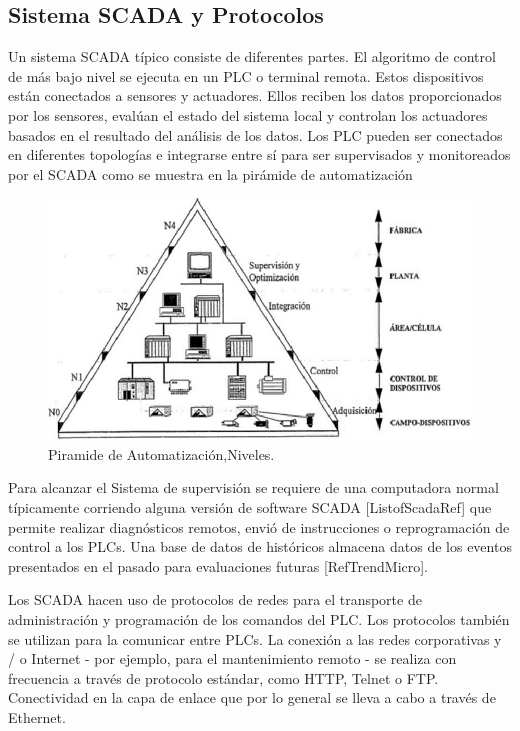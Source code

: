 \documentclass[jou,apacite]{apa6}   %
\begin{document}
\subsection{Sistema SCADA y Protocolos }
Un sistema SCADA típico consiste de diferentes partes. El algoritmo de control de más bajo nivel se ejecuta en un PLC o terminal remota. Estos dispositivos están conectados a sensores y actuadores. Ellos reciben los datos proporcionados por los sensores, evalúan el estado del sistema local  y controlan los actuadores basados en el resultado del análisis de los datos. Los PLC pueden ser conectados en diferentes topologías e integrarse entre sí para ser supervisados y monitoreados por el SCADA como se muestra en la pirámide de automatización 
\begin{figure}[htb]
\centering
\includegraphics[scale=0.4]{images/piramide.png}
\caption{Piramide de Automatización,Niveles.} \label{fig:piramide}
\end{figure}
Para alcanzar el Sistema de supervisión se requiere de una computadora normal típicamente corriendo alguna versión de software SCADA  [ListofScadaRef] que permite realizar diagnósticos remotos, envió de instrucciones o reprogramación de control a los PLCs. Una base de datos de históricos almacena datos de los eventos presentados  en el pasado para evaluaciones futuras [RefTrendMicro]. 

Los SCADA hacen uso de protocolos de redes para el transporte de administración y  programación de los comandos del PLC. Los protocolos también se utilizan para la comunicar  entre PLCs. La conexión a las redes corporativas y / o Internet - por ejemplo, para el mantenimiento remoto - se realiza con frecuencia a través de protocolo estándar, como HTTP, Telnet o FTP. Conectividad en la capa de enlace que por lo general se lleva a cabo a través de Ethernet.
\end{document}

